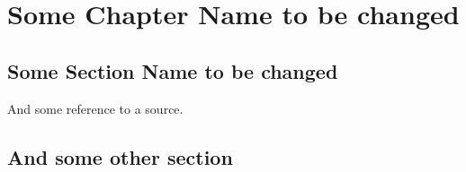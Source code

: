 \chapter{Some Chapter Name to be changed}
\blindtext
\section{Some Section Name to be changed}
\Blindtext
And some reference to a source.~\autocite{kingma2022autoencoding}

\section{And some other section}